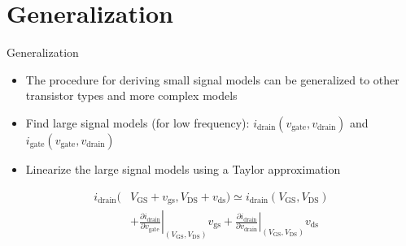 \section{Generalization}
\begin{frame}{Generalization}
    \begin{itemize}
        \item The procedure for deriving small signal models can be generalized to other 
        transistor types and more complex models
        \item Find large signal models (for low frequency): 
        $i_{\mathrm{drain}}(v_{\mathrm{gate}}, v_{\mathrm{drain}})$ and 
        $i_{\mathrm{gate}}(v_{\mathrm{gate}}, v_{\mathrm{drain}})$
        \item Linearize the large signal models using a Taylor approximation
    \end{itemize}
    \begin{align*}
        i_{\mathrm{drain}}(&V_{\mathrm{GS}}+v_{\mathrm{gs}},
        V_{\mathrm{DS}}+v_{\mathrm{ds}})\simeq i_{\mathrm{drain}}
        (V_{\mathrm{GS}},V_{\mathrm{DS}}) \\
        &+\left.\frac{\partial i_{\mathrm{drain}}}{\partial v_{\mathrm{gate}}}\right|
        _{(V_{\mathrm{GS}},V_{\mathrm{DS}})} v_{\mathrm{gs}} 
        + \left. \frac{\partial i_{\mathrm{drain}}}{\partial v_{\mathrm{drain}}} \right|
        _{(V_{\mathrm{GS}},V_{\mathrm{DS}})} v_{\mathrm{ds}} \\
    \end{align*}
\end{frame}

